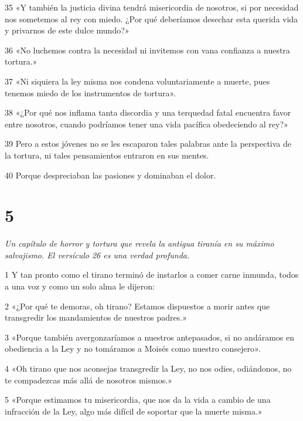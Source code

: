 \par 35 «Y también la justicia divina tendrá misericordia de nosotros, si por necesidad nos sometemos al rey con miedo. ¿Por qué deberíamos desechar esta querida vida y privarnos de este dulce mundo?»

\par 36 «No luchemos contra la necesidad ni invitemos con vana confianza a nuestra tortura.»

\par 37 «Ni siquiera la ley misma nos condena voluntariamente a muerte, pues tenemos miedo de los instrumentos de tortura».

\par 38 «¿Por qué nos inflama tanta discordia y una terquedad fatal encuentra favor entre nosotros, cuando podríamos tener una vida pacífica obedeciendo al rey?»

\par 39 Pero a estos jóvenes no se les escaparon tales palabras ante la perspectiva de la tortura, ni tales pensamientos entraron en sus mentes.

\par 40 Porque despreciaban las pasiones y dominaban el dolor.

\chapter{5}

\par \textit{Un capítulo de horror y tortura que revela la antigua tiranía en su máximo salvajismo. El versículo 26 es una verdad profunda.}

\par 1 Y tan pronto como el tirano terminó de instarlos a comer carne inmunda, todos a una voz y como un solo alma le dijeron:

\par 2 «¿Por qué te demoras, oh tirano? Estamos dispuestos a morir antes que transgredir los mandamientos de nuestros padres.»

\par 3 «Porque también avergonzaríamos a nuestros antepasados, si no andáramos en obediencia a la Ley y no tomáramos a Moisés como nuestro consejero».

\par 4 «Oh tirano que nos aconsejas transgredir la Ley, no nos odies, odiándonos, no te compadezcas más allá de nosotros mismos.»

\par 5 «Porque estimamos tu misericordia, que nos da la vida a cambio de una infracción de la Ley, algo más difícil de soportar que la muerte misma.»

